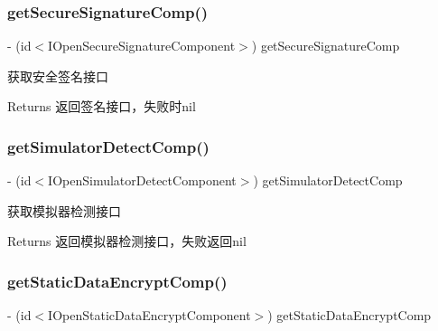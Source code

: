 \subsubsection{\texorpdfstring{get\+Secure\+Signature\+Comp()}{getSecureSignatureComp()}}
{\footnotesize\ttfamily -\/ (id$<$I\+Open\+Secure\+Signature\+Component$>$) get\+Secure\+Signature\+Comp \begin{DoxyParamCaption}{ }\end{DoxyParamCaption}}

获取安全签名接口

\begin{DoxyReturn}{Returns}
返回签名接口，失败时nil 
\end{DoxyReturn}
\mbox{\label{interface_open_security_guard_manager_a2a38d633173559b468e03fc156a98457}} 
\subsubsection{\texorpdfstring{get\+Simulator\+Detect\+Comp()}{getSimulatorDetectComp()}}
{\footnotesize\ttfamily -\/ (id$<$I\+Open\+Simulator\+Detect\+Component$>$) get\+Simulator\+Detect\+Comp \begin{DoxyParamCaption}{ }\end{DoxyParamCaption}}

获取模拟器检测接口

\begin{DoxyReturn}{Returns}
返回模拟器检测接口，失败返回nil 
\end{DoxyReturn}
\mbox{\label{interface_open_security_guard_manager_a94900352c38aee0776b8f007d73a6cf4}} 
\subsubsection{\texorpdfstring{get\+Static\+Data\+Encrypt\+Comp()}{getStaticDataEncryptComp()}}
{\footnotesize\ttfamily -\/ (id$<$I\+Open\+Static\+Data\+Encrypt\+Component$>$) get\+Static\+Data\+Encrypt\+Comp \begin{DoxyParamCaption}{ }\end{DoxyParamCaption}}

